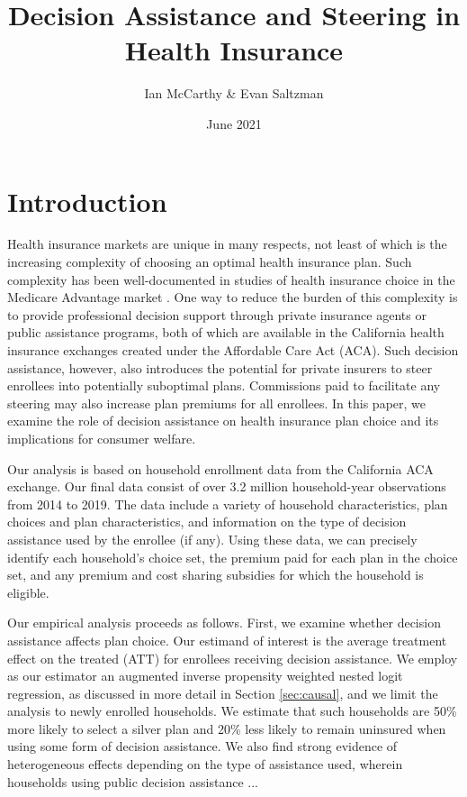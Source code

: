 \documentclass[12pt]{article}
\begin{document}
\title{Decision Assistance and Steering in Health Insurance}
\author{Ian McCarthy \& Evan Saltzman}
\date{June 2021}
\maketitle

\vspace{-2ex}
\begin{abstract}
\noindent 
\end{abstract}

\clearpage

\section{Introduction}
\label{sec:introduction}

Health insurance markets are unique in many respects, not least of which is the increasing complexity of choosing an optimal health insurance plan. Such complexity has been well-documented in studies of health insurance choice in the Medicare Advantage market \citep{abaluck2011, ketcham2012, gruber2017}. One way to reduce the burden of this complexity is to provide professional decision support through private insurance agents or public assistance programs, both of which are available in the California health insurance exchanges created under the Affordable Care Act (ACA). Such decision assistance, however, also introduces the potential for private insurers to steer enrollees into potentially suboptimal plans. Commissions paid to facilitate any steering may also increase plan premiums for all enrollees. In this paper, we examine the role of decision assistance on health insurance plan choice and its implications for consumer welfare.

Our analysis is based on household enrollment data from the California ACA exchange. Our final data consist of over 3.2 million household-year observations from 2014 to 2019. The data include a variety of household characteristics, plan choices and plan characteristics, and information on the type of decision assistance used by the enrollee (if any). Using these data, we can precisely identify each household's choice set, the premium paid for each plan in the choice set, and any premium and cost sharing subsidies for which the household is eligible.

Our empirical analysis proceeds as follows. First, we examine whether decision assistance affects plan choice. Our estimand of interest is the average treatment effect on the treated (ATT) for enrollees receiving decision assistance. We employ as our estimator an augmented inverse propensity weighted nested logit regression, as discussed in more detail in Section \ref{sec:causal}, and we limit the analysis to newly enrolled households. We estimate that such households are 50\% more likely to select a silver plan and 20\% less likely to remain uninsured when using some form of decision assistance. We also find strong evidence of heterogeneous effects depending on the type of assistance used, wherein households using public decision assistance ...
\end{document}
